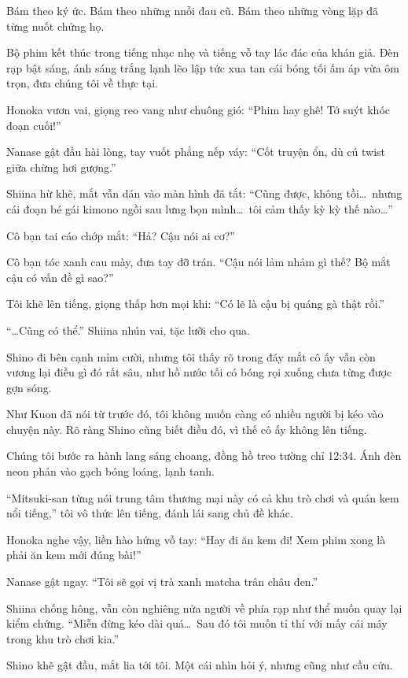 \documentclass[../main.tex]{subfiles}
\begin{document}
Bám theo ký ức. Bám theo những nnỗi đau cũ. Bám theo những vòng lặp đã từng nuốt chửng họ.

\ct

Bộ phim kết thúc trong tiếng nhạc nhẹ và tiếng vỗ tay lác đác của khán giả. Đèn rạp bật sáng, ánh sáng trắng lạnh lẽo lập tức xua tan cái bóng tối ấm áp vừa ôm trọn, đưa chúng tôi về thực tại.

Honoka vươn vai, giọng reo vang như chuông gió: ``Phim hay ghê! Tớ suýt khóc đoạn cuối!''

Nanase gật đầu hài lòng, tay vuốt phẳng nếp váy: ``Cốt truyện ổn, dù cú twist giữa chừng hơi gượng.''

Shiina hừ khẽ, mắt vẫn dán vào màn hình đã tắt: ``Cũng được, không tồi\dots\ nhưng cái đoạn bé gái kimono ngồi sau lưng bọn mình\dots\ tôi cảm thấy kỳ kỳ thế nào\dots''

Cô bạn tai cáo chớp mắt: ``Hả? Cậu nói ai cơ?''

Cô bạn tóc xanh cau mày, đưa tay đỡ trán. ``Cậu nói lảm nhảm gì thế? Bộ mắt cậu có vấn đề gì sao?''

Tôi khẽ lên tiếng, giọng thấp hơn mọi khi: ``Có lẽ là cậu bị quáng gà thật rồi.''

``\dots Cũng có thể.'' Shiina nhún vai, tặc lưỡi cho qua.

Shino đi bên cạnh mỉm cười, nhưng tôi thấy rõ trong đáy mắt cô ấy vẫn còn vương lại điều gì đó rất sâu, như hồ nước tối có bóng rọi xuống chưa từng được gợn sóng.

Như Kuon đã nói từ trước đó, tôi không muốn càng có nhiều người bị kéo vào chuyện này. Rõ ràng Shino cũng biết điều đó, vì thế cô ấy không lên tiếng.

Chúng tôi bước ra hành lang sáng choang, đồng hồ treo tường chỉ 12:34. Ánh đèn neon phản vào gạch bóng loáng, lạnh tanh.

``Mitsuki-san từng nói trung tâm thương mại này có cả khu trò chơi và quán kem nổi tiếng,'' tôi vô thức lên tiếng, đánh lái sang chủ đề khác.

Honoka nghe vậy, liền hào hứng vỗ tay: ``Hay đi ăn kem đi! Xem phim xong là phải ăn kem mới đúng bài!''

Nanase gật ngay. ``Tôi sẽ gọi vị trà xanh matcha trân châu đen.''

Shiina chống hông, vẫn còn nghiêng nửa người về phía rạp như thể muốn quay lại kiểm chứng. ``Miễn đừng kéo dài quá\dots\ Sau đó tôi muốn tỉ thí với mấy cái máy trong khu trò chơi kia.''

Shino khẽ gật đầu, mắt lia tới tôi. Một cái nhìn hỏi ý, nhưng cũng như cầu cứu.
\end{document}
